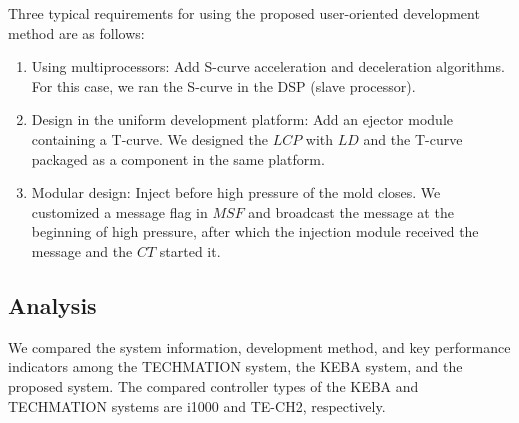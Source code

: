 \documentclass[journal,UTF8]{IEEEtran}
\begin{document}
	Three typical requirements for using the proposed user-oriented development method are as follows:
	\begin{enumerate}
		\item Using multiprocessors: Add S-curve acceleration and deceleration algorithms. For this case, we ran the S-curve in the DSP (slave processor).
		\item Design in the uniform development platform: Add an ejector module containing a T-curve. We designed the $LCP$ with $LD$ and the T-curve packaged as a component in the same platform.
		\item Modular design: Inject before high pressure of the mold closes. We customized a message flag in $MSF$ and broadcast the message at the beginning of high pressure, after which the injection module received the message and the $CT$ started it.
	\end{enumerate}
	\subsection{Analysis}
	We compared the system information, development method, and key performance indicators among the TECHMATION system, the KEBA system, and the proposed system. The compared controller types of the KEBA and TECHMATION systems are i1000 and TE-CH2, respectively. 
	
\end{document}
